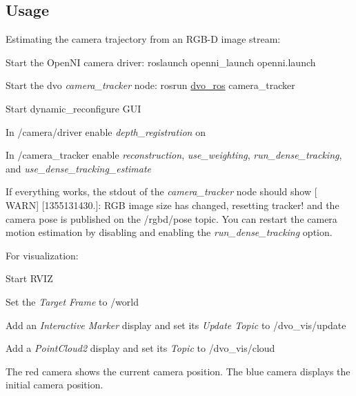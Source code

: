 \subsection*{Usage}

Estimating the camera trajectory from an R\+G\+B-\/D image stream\+:


\begin{DoxyItemize}
\item Start the Open\+NI camera driver\+: {\ttfamily roslaunch openni\+\_\+launch openni.\+launch}
\item Start the dvo {\itshape camera\+\_\+tracker} node\+: {\ttfamily rosrun \mbox{\hyperlink{namespacedvo__ros}{dvo\+\_\+ros}} camera\+\_\+tracker}
\item Start dynamic\+\_\+reconfigure G\+UI
\begin{DoxyItemize}
\item In {\ttfamily /camera/driver} enable {\itshape depth\+\_\+registration} on
\item In {\ttfamily /camera\+\_\+tracker} enable {\itshape reconstruction}, {\itshape use\+\_\+weighting}, {\itshape run\+\_\+dense\+\_\+tracking}, and {\itshape use\+\_\+dense\+\_\+tracking\+\_\+estimate}
\end{DoxyItemize}
\end{DoxyItemize}

If everything works, the stdout of the {\itshape camera\+\_\+tracker} node should show {\ttfamily \mbox{[} W\+A\+RN\mbox{]} \mbox{[}1355131430.\mbox{]}\+: R\+GB image size has changed, resetting tracker!} and the camera pose is published on the {\ttfamily /rgbd/pose} topic. You can restart the camera motion estimation by disabling and enabling the {\itshape run\+\_\+dense\+\_\+tracking} option.

For visualization\+:


\begin{DoxyItemize}
\item Start R\+V\+IZ
\item Set the {\itshape Target Frame} to {\ttfamily /world}
\item Add an {\itshape Interactive Marker} display and set its {\itshape Update Topic} to {\ttfamily /dvo\+\_\+vis/update}
\item Add a {\itshape Point\+Cloud2} display and set its {\itshape Topic} to {\ttfamily /dvo\+\_\+vis/cloud}
\end{DoxyItemize}

The red camera shows the current camera position. The blue camera displays the initial camera position.

